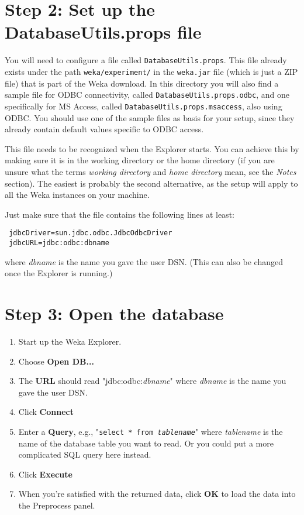 \section*{Step 2: Set up the DatabaseUtils.props file}
You will need to configure a file called \texttt{DatabaseUtils.props}. This file already exists under the path \texttt{weka/experiment/} in the \texttt{weka.jar} file (which is just a ZIP file) that is part of the Weka download. In this directory you will also find a sample file for ODBC connectivity, called \texttt{DatabaseUtils.props.odbc}, and one specifically for MS Access, called \texttt{DatabaseUtils.props.msaccess}, also using ODBC. You should use one of the sample files as basis for your setup, since they already contain default values specific to ODBC access.

This file needs to be recognized when the Explorer starts. You can achieve this by making sure it is in the working directory or the home directory (if you are unsure what the terms \textit{working directory} and \textit{home directory} mean, see the \textit{Notes} section). The easiest is probably the second alternative, as the setup will apply to all the Weka instances on your machine.

Just make sure that the file contains the following lines at least:

\begin{verbatim}
 jdbcDriver=sun.jdbc.odbc.JdbcOdbcDriver
 jdbcURL=jdbc:odbc:dbname
\end{verbatim}

\noindent where \textit{dbname} is the name you gave the user DSN. (This can also be changed once the Explorer is running.)

\newpage
\section*{Step 3: Open the database}
\begin{enumerate}
	\item Start up the Weka Explorer.
	\item Choose \textbf{Open DB...}
	\item The \textbf{URL} should read "jdbc:odbc:\textit{dbname}" where \textit{dbname} is the name you gave the user DSN.
	\item Click \textbf{Connect}
	\item Enter a \textbf{Query}, e.g., "\texttt{select * from \textit{tablename}}" where \textit{tablename} is the name of the database table you want to read. Or you could put a more complicated SQL query here instead.
	\item Click \textbf{Execute}
	\item When you're satisfied with the returned data, click \textbf{OK} to load the data into the Preprocess panel.
\end{enumerate}

